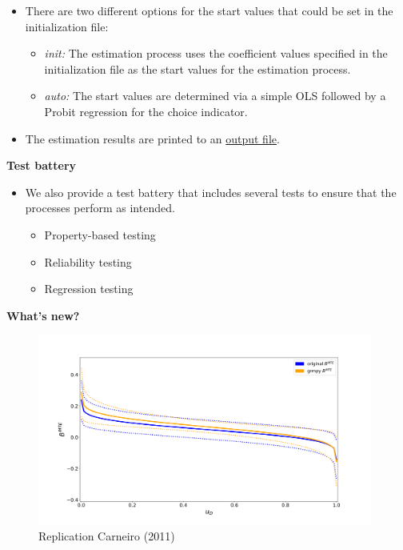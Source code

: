 \begin{frame}
\begin{itemize}\setlength\itemsep{1em}
\item There are two different options for the start values that could be set in the initialization file:\medskip
  \begin{itemize}\setlength\itemsep{1em}
  \item \textit{init:} The estimation process uses the coefficient values specified in the initialization file as the start values for the estimation process.
  \item \textit{auto:} The start values are determined via a simple OLS followed by a Probit regression for the choice indicator.
  \end{itemize}
  \item The estimation results are printed to an \href{examples/est.grmpy.info}{output file}.
\end{itemize}
\end{frame}

\begin{frame}
\textbf{Test battery}

\medskip
\begin{itemize}\setlength\itemsep{1em}
\item We also provide a test battery that includes several tests to ensure that the processes perform as intended.\medskip
\begin{itemize}\setlength\itemsep{1em}
\item Property-based testing
\item Reliability testing
\item Regression testing
\end{itemize}
\end{itemize}
\end{frame}

\begin{frame}
\begin{center}
\Large{\textbf{What's new?}}
\end{center}
\end{frame}

\begin{frame}

  \begin{figure}
  	\caption{Replication Carneiro (2011)}
    \includegraphics[width=110mm]{figures/fig-marginal-benefit-parametric-replication.png}
  \end{figure}
\end{frame}


